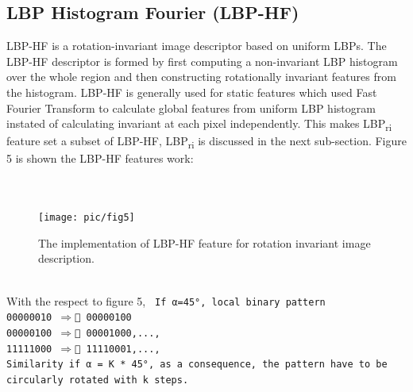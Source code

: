 \documentclass[review]{elsarticle}
\begin{document}
\subsection{LBP Histogram Fourier (LBP-HF)}
LBP-HF is a rotation-invariant image descriptor based on uniform LBPs. The LBP-HF descriptor is formed by first computing a non-invariant LBP histogram over the whole region and then constructing rotationally invariant features from the histogram. LBP-HF is generally used for static features which used Fast Fourier Transform to calculate global features from uniform LBP histogram instated of calculating invariant at each pixel independently. This makes LBP\textsubscript{ri} feature set a subset of LBP-HF, LBP\textsubscript{ri} is discussed in the next sub-section. Figure 5 is shown the LBP-HF features work: \\ \\ \\
\begin{figure}[h]
	\centering
	\texttt{[image: pic/fig5]}
	\caption{The implementation of LBP-HF feature for rotation invariant image description.}
	\label{fig:fig5}
\end{figure} \\
With the respect to figure 5, 
\texttt{\noindent
	\newline\noindent
	If α=\ang{45}, local binary pattern\\
	\phantom{x}\hspace{10ex}00000010 $\Rightarrow$  00000100 \\
	\phantom{x}\hspace{10ex}00000100 $\Rightarrow$  00001000,...,\\
	\phantom{x}\hspace{10ex}11111000 $\Rightarrow$  11110001,...,\\
	Similarity if α = K * \ang{45}, as a consequence, the pattern have to be circularly rotated with k steps. \\
}
\end{document}
